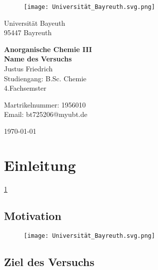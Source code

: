 \documentclass[12pt, a4paper]{article}
\begin{document}
\begin{figure}
    \texttt{[image: Universität\_Bayreuth.svg.png]}
\end{figure}



{\raggedright Universität Bayeuth\\  95447 Bayreuth}


\vspace{5cm}

\begin{center}
{\LARGE\bf{Anorganische Chemie III}} \\  
\vspace{1cm}
{\Large\bf{Name des Versuchs}}\\
\vspace{0.5cm}
{\large Justus Friedrich\\}
{Studiengang: B.Sc. Chemie\\}
{4.Fachsemster}
\end{center}





\thispagestyle{empty}
\begin{center}
{\small Martrikelnummer: 1956010 \\
Email:  bt725206@myubt.de}
\end{center}

\vspace{5cm}

\today


\newpage
\tableofcontents
\thispagestyle{empty}


\newpage
\setcounter{page}{1}
\section{Einleitung}
\blindtext
\ref{abb1}

\subsection{Motivation}

\begin{figure}[h]
    \centering
    \texttt{[image: Universität\_Bayreuth.svg.png]}
    \caption{}
    \label{abb1}
\end{figure}




\subsection{Ziel des Versuchs}
\end{document}
